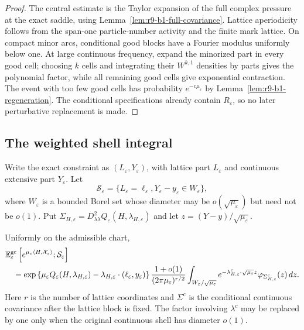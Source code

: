 \begin{proof}
The central estimate is the Taylor expansion of the full complex pressure at
the exact saddle, using Lemma~\ref{lem:r9-b1-full-covariance}.  Lattice
aperiodicity follows from the span-one particle-number activity and the finite
mark lattice.  On compact minor arcs, conditional good blocks have a Fourier
modulus uniformly below one.  At large continuous frequency, expand the
minorized part in every good cell; choosing $k$ cells and integrating their
$W^{k,1}$ densities by parts gives the polynomial factor, while all remaining
good cells give exponential contraction.  The event with too few good cells
has probability $e^{-c\mu_\varepsilon}$ by
Lemma~\ref{lem:r9-b1-regeneration}.  The conditional specifications already
contain $R_\varepsilon$, so no later perturbative replacement is made.
\end{proof}

\subsection{The weighted shell integral}

Write the exact constraint as $(L_\varepsilon,Y_\varepsilon)$, with lattice
part $L_\varepsilon$ and continuous extensive part $Y_\varepsilon$.  Let
\[
 \mathcal S_\varepsilon
 =\{L_\varepsilon=\ell_\varepsilon,
 Y_\varepsilon-y_\varepsilon\in W_\varepsilon\},
\]
where $W_\varepsilon$ is a bounded Borel set whose diameter may be
$o(\sqrt{\mu_\varepsilon})$ but need not be $o(1)$.  Put
$\Sigma_{H,\varepsilon}=D^2_{\lambda\lambda}
Q_\varepsilon(H,\lambda_{H,\varepsilon})$ and let
$z=(Y-y)/\sqrt{\mu_\varepsilon}$.

\begin{theorem}
\label{thm:r9-b1-coefficient}
Uniformly on the admissible chart,
\[
\begin{aligned}
 &\mathbb E^{\rm gc}_\varepsilon
 \left[e^{\mu_\varepsilon\langle H,\mathcal X_\varepsilon\rangle};
 \mathcal S_\varepsilon\right]\\
 &\quad=
 \exp\left\{
 \mu_\varepsilon Q_\varepsilon(H,\lambda_{H,\varepsilon})
 -\lambda_{H,\varepsilon}\cdot(\ell_\varepsilon,y_\varepsilon)
 \right\}
 \frac{1+o(1)}{(2\pi\mu_\varepsilon)^{r/2}}
 \int_{W_\varepsilon/\sqrt{\mu_\varepsilon}}
 e^{-\lambda_{H,\varepsilon}^{c}\cdot\sqrt{\mu_\varepsilon}z}
 \varphi_{\Sigma^c_{H,\varepsilon}}(z)\,dz .
\end{aligned}
\]
Here $r$ is the number of lattice coordinates and $\Sigma^c$ is the
conditional continuous covariance after the lattice block is fixed.  The
factor involving $\lambda^c$ may be replaced by one only when the original
continuous shell has diameter $o(1)$.
\end{theorem}

